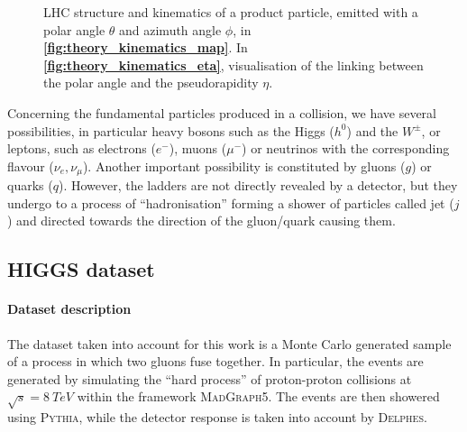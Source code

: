 \documentclass[../main/main.tex]{subfiles}
\begin{document}
\begin{figure}[!h]
    \begin{minipage}[c]{0.49\linewidth}
        \vspace{0pt}
        \centering
    \end{minipage}%
    \hfill%
    \begin{minipage}[c]{0.49\linewidth}
        \vspace{0pt}
        \centering
    \end{minipage}%
    \caption{LHC structure and kinematics of a product particle, emitted with a polar angle \( \theta \) and azimuth angle \( \phi \), in \textbf{\ref{fig:theory_kinematics_map}}. In \textbf{\ref{fig:theory_kinematics_eta}}, visualisation of the linking between the polar angle and the pseudorapidity \( \eta \).}
    \label{fig:theory_kinematics_map_eta}
\end{figure}

Concerning the fundamental particles produced in a collision, we have several possibilities, in particular heavy bosons such as the Higgs (\( h^{0} \)) and the \( W^{\pm} \), or leptons, such as electrons (\( e^{-} \)), muons (\( \mu^{-} \)) or neutrinos with the corresponding flavour (\( \nu_{e}, \nu_{\mu} \)). Another important possibility is constituted by gluons (\( g \)) or quarks (\( q \)). However, the ladders are not directly revealed by a detector, but they undergo to a process of ``hadronisation'' forming a shower of particles called jet (\( j \)) and directed towards the direction of the gluon/quark causing them.



\subsection{HIGGS dataset}
\label{ssec:theory_HIGGS}

\paragraph{Dataset description}
The dataset taken into account for this work is a Monte Carlo generated sample of a process in which two gluons fuse together. In particular, the events are generated by simulating the ``hard process'' of proton-proton collisions at \( \sqrt{s} = 8 \ \si{TeV} \) within the framework \textsc{MadGraph5}. The events are then showered using \textsc{Pythia}, while the detector response is taken into account by \textsc{Delphes}.
\end{document}
